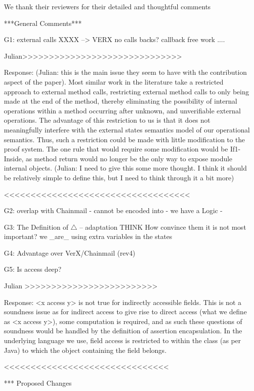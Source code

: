 We thank their reviewers for their detailed and thoughtful comments 


***General Comments***

G1: external calls
XXXX
--> VERX no calls backs?
callback free work .... 

Julian>>>>>>>>>>>>>>>>>>>>>>>>>>>>>>

Response: (Julian: this is the main issue they seem to have with the contribution aspect of the paper). Most similar work in the literature take a restricted approach to external method calls, restricting external method calls to
only being made at the end of the method, thereby eliminating the possibility of internal operations within a method occurring after unknown, and unverifiable external operations. The advantage of this restriction to us is that
it does not meaningfully interfere with the external states semantics model of our operational semantics. Thus, such a restriction could be made with little modification to the proof system. The one rule that would require some modification would be If1-Inside, as method return would no longer be the only way to expose module internal objects.
(Julian: I need to give this some more thought. I think it should be relatively simple to define this, but I need to think through it a bit more)

<<<<<<<<<<<<<<<<<<<<<<<<<<<<<<<<<<<

G2:  overlap with Chainmail
- cannot be encoded into
- we have a Logic
- %

G3: The Definition of $\triangle$ -- adaptation
THINK
How convince them it is not most important?
we _are_ using extra variables in the states

G4: Advantage over VerX/Chainmail (rev4)

G5: Is access deep?

Julian >>>>>>>>>>>>>>>>>>>>>>>>>

Response: <x access y> is not true for indirectly accessible fields. This is not a soundness issue as for indirect access to give rise to direct access (what we define as <x access y>), some computation is required, and as such these questions of soundness would be handled by the definition of assertion encapsulation. In the underlying language we use, field access is restricted to within the class (as per Java) to which the object containing the field belongs.

<<<<<<<<<<<<<<<<<<<<<<<<<<<<<<<


*** Proposed Changes

